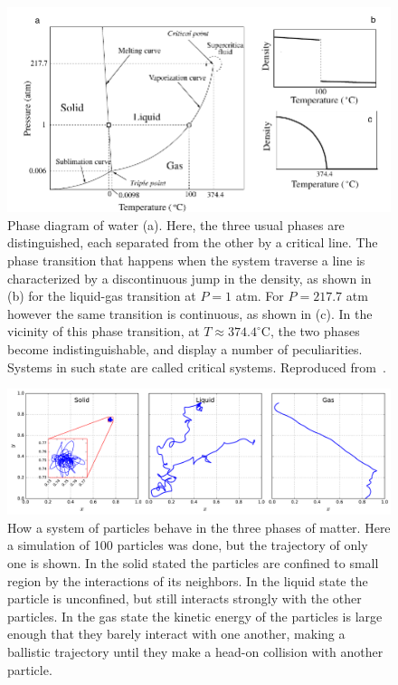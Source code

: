 \begin{figure}[h]
\begin{center}
    \includegraphics[scale=1.0]{chapters/ch2-crit/figs/water}
\end{center}
\caption{Phase diagram of water (a). Here, the three usual phases are
    distinguished, each separated from the other by a critical line. The phase
    transition that happens when the system traverse a line is characterized by
    a discontinuous jump in the density, as shown in (b) for the liquid-gas
    transition at $P=1$ atm. For $P=217.7$ atm however the same transition is
    continuous, as shown in (c). In the vicinity of this phase transition, at
    $T\approx374.4^\circ$C, the two phases become indistinguishable, and
    display a number of peculiarities. Systems in such state are called
    critical systems. Reproduced from~\cite{Sole2011}.}
\label{fig:water}
\end{figure}


\begin{figure}[h]
\begin{center}
    \includegraphics[scale=0.4]{chapters/ch2-crit/figs/phases}
\end{center}
\caption{How a system of particles behave in the three phases of matter. Here a
    simulation of 100 particles was done, but the trajectory of only one is
    shown. In the solid stated the particles are confined to small region by
    the interactions of its neighbors. In the liquid state the particle is
    unconfined, but still interacts strongly with the other particles. In the
    gas state the kinetic energy of the particles is large enough that they
    barely interact with one another, making a ballistic trajectory until
    they make a head-on collision with another particle.}
\label{fig:phases}
\end{figure}


